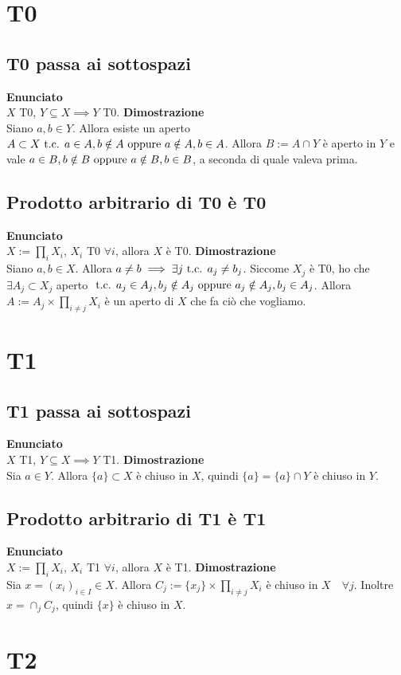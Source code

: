 \documentclass[a4paper,11pt,NoNotes,GeneralMath]{stdmdoc}
\newcommand{\Enunciato}{\vskip 0.05cm \noindent \textbf{Enunciato} \\ }
\renewcommand{\Dimostrazione}{\vskip 0.05cm \noindent \textbf{Dimostrazione} \\ }
\begin{document}
	\section*{T0}
	\subsection*{T0 passa ai sottospazi}
	\Enunciato $X$ T0, $Y \subseteq X \implies Y$ T0.
	\Dimostrazione Siano $a, b \in Y$. Allora esiste un aperto $A \subset X \mbox{ t.c. } a \in A, b \notin A \text{ oppure } a \notin A, b \in A$. Allora $B := A \cap Y$ è aperto in $Y$ e vale $a \in B, b \notin B \text{ oppure } a \notin B, b \in B$, a seconda di quale valeva prima.

	\subsection*{Prodotto arbitrario di T0 è T0}
	\Enunciato $X := \prod_i X_i$, $X_i$ T0 $\forall i$, allora $X$ è T0.
	\Dimostrazione Siano $a, b \in X$. Allora $a \neq b \implies \exists j \mbox{ t.c. } a_j \neq b_j$. Siccome $X_j$ è T0, ho che $\exists A_j \subset X_j$ aperto $\mbox{ t.c. } a_j \in A_j, b_j \notin A_j \text{ oppure } a_j \notin A_j, b_j \in A_j$. Allora $A := A_j \times \prod_{i \neq j} X_i$ è un aperto di $X$ che fa ciò che vogliamo.

	\section*{T1}
	\subsection*{T1 passa ai sottospazi}
	\Enunciato $X$ T1, $Y \subseteq X \implies Y$ T1.
	\Dimostrazione Sia $a \in Y$. Allora $\{a\} \subset X$ è chiuso in $X$, quindi $\{a\} = \{a\} \cap Y$ è chiuso in $Y$.

	\subsection*{Prodotto arbitrario di T1 è T1}
	\Enunciato $X := \prod_i X_i$, $X_i$ T1 $\forall i$, allora $X$ è T1.
	\Dimostrazione Sia $x = (x_i)_{i \in I} \in X$. Allora $C_j := \{x_j\} \times \prod_{i \neq j} X_i$ è chiuso in $X \quad \forall j$. Inoltre $x = \cap_j C_j$, quindi $\{x\}$ è chiuso in $X$.

	\section*{T2}
\end{document}
